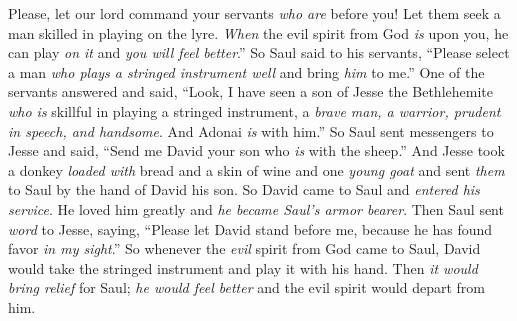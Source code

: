 \begin{biblechapter}
\verse Please, let our lord command your servants \textit{who are} before you! Let them seek a man skilled in playing on the lyre. \textit{When} the evil spirit from God \textit{is} upon you, he can play \textit{on it} and \textit{you will feel better}.”
\verse So Saul said to his servants, “Please select a man \textit{who plays a stringed instrument well} and bring \textit{him} to me.”
\verse One of the servants answered and said, “Look, I have seen a son of Jesse the Bethlehemite \textit{who is} skillful in playing a stringed instrument, a \textit{brave man, a warrior, prudent in speech, and handsome}. And Adonai \textit{is} with him.”
\verse So Saul sent messengers to Jesse and said, “Send me David your son who \textit{is} with the sheep.”
\verse And Jesse took a donkey \textit{loaded with} bread and a skin of wine and one \textit{young goat} and sent \textit{them} to Saul by the hand of David his son.
\verse So David came to Saul and \textit{entered his service}. He loved him greatly and \textit{he became Saul’s armor bearer}.
\verse Then Saul sent \textit{word} to Jesse, saying, “Please let David stand before me, because he has found favor \textit{in my sight}.”
\verse So whenever the \textit{evil} spirit from God came to Saul, David would take the stringed instrument and play it with his hand. Then \textit{it would bring relief} for Saul; \textit{he would feel better} and the evil spirit would depart from him.
\end{biblechapter}

